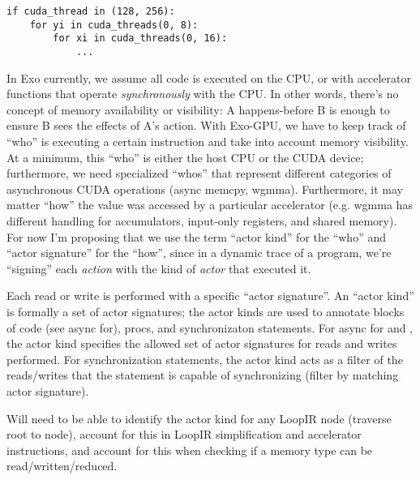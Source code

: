 {\color{lightttColor}
\begin{verbatim}
if cuda_thread in (128, 256):
    for yi in cuda_threads(0, 8):
        for xi in cuda_threads(0, 16):
            ...
\end{verbatim}
}

\filbreak
{} In Exo currently, we assume all code is executed on the CPU, or with accelerator functions that operate \textit{synchronously} with the CPU.
In other words, there's no concept of memory availability or visibility: A happens-before B is enough to ensure B sees the effects of A's action.
With Exo-GPU, we have to keep track of ``who'' is executing a certain instruction and take into account memory visibility.
At a minimum, this ``who'' is either the host CPU or the CUDA device; furthermore, we need specialized ``whos'' that represent different categories of asynchronous CUDA operations (async memcpy, wgmma).
Furthermore, it may matter ``how'' the value was accessed by a particular accelerator (e.g. wgmma has different handling for accumulators, input-only registers, and shared memory).
For now I'm proposing that we use the term ``actor kind'' for the ``who'' and ``actor signature'' for the ``how'', since in a dynamic trace of a program, we're ``signing'' each \textit{action} with the kind of \textit{actor} that executed it.

\filbreak
Each read or write is performed with a specific ``actor signature''.
An ``actor kind'' is formally a set of actor signatures; the actor kinds are used to annotate blocks of code (see async for),  procs, and synchronizaton statements.
For async for and , the actor kind specifies the allowed set of actor signatures for reads and writes performed.
For synchronization statements, the actor kind acts as a filter of the reads/writes that the statement is capable of synchronizing (filter by matching actor signature).

\filbreak
{} Will need to be able to identify the actor kind for any LoopIR node (traverse root to node), account for this in LoopIR simplification and accelerator instructions, and account for this when checking if a memory type can be read/written/reduced.


